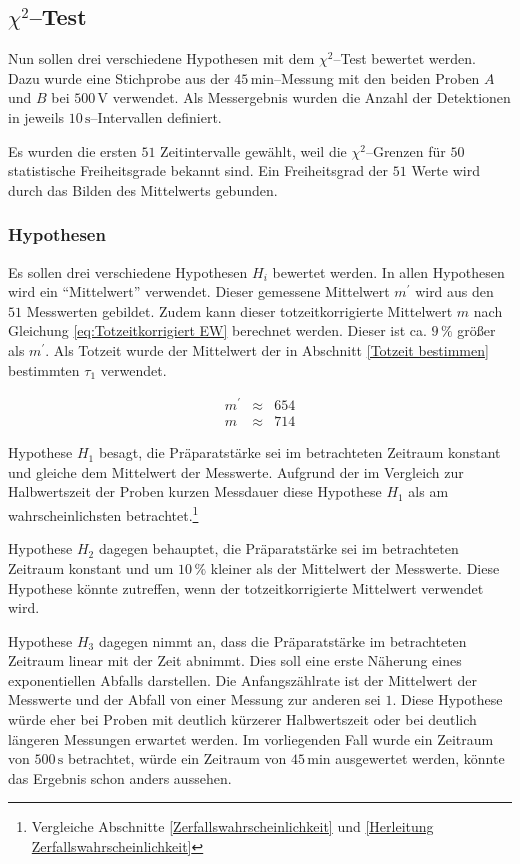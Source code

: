 \documentclass[12pt,a4paper]{scrartcl}
\numberwithin{equation}{section} %
\begin{document}
\hypertarget{chi2test}{\subsection{$\chi^2$--Test}\label{chi2test}}

Nun sollen drei verschiedene Hypothesen mit dem $\chi^2$--Test bewertet werden. Dazu wurde eine Stichprobe aus der $45\mathrm{\,min}$--Messung mit den beiden Proben $A$ und $B$ bei $500\mathrm{\,V}$ verwendet. Als Messergebnis wurden die Anzahl der Detektionen in jeweils $10\mathrm{\,s}$--Intervallen definiert.

Es wurden die ersten $51$ Zeitintervalle gewählt, weil die $\chi^2$--Grenzen für $50$ statistische Freiheitsgrade bekannt sind. \cite{Kapur} Ein Freiheitsgrad der $51$ Werte wird durch das Bilden des Mittelwerts gebunden.

\subsubsection{Hypothesen}
\label{Hypothesen}
Es sollen drei verschiedene Hypothesen $H_i$ bewertet werden. In allen Hypothesen wird ein ``Mittelwert'' verwendet. Dieser gemessene Mittelwert $m^\prime$ wird aus den $51$ Messwerten gebildet. Zudem kann dieser totzeitkorrigierte Mittelwert $m$ nach Gleichung \eqref{eq:Totzeitkorrigiert EW} berechnet werden. Dieser ist ca. $9\,\%$ größer als $m^\prime$. Als Totzeit wurde der Mittelwert der in Abschnitt \ref{Totzeit bestimmen} bestimmten $\tau_1$ verwendet.

\begin{eqnarray}
	m^\prime &\approx& 654 \\
	m &\approx& 714
\end{eqnarray}

Hypothese $H_1$ besagt, die Präparatstärke sei im betrachteten Zeitraum konstant und gleiche dem Mittelwert der Messwerte. Aufgrund der im Vergleich zur Halbwertszeit der Proben kurzen Messdauer diese Hypothese $H_1$ als am wahrscheinlichsten betrachtet.\footnote{Vergleiche Abschnitte \ref{Zerfallswahrscheinlichkeit} und \ref{Herleitung Zerfallswahrscheinlichkeit}}

Hypothese $H_2$ dagegen behauptet, die Präparatstärke sei im betrachteten Zeitraum konstant und um $10\,\%$ kleiner als der Mittelwert der Messwerte. Diese Hypothese könnte zutreffen, wenn der totzeitkorrigierte Mittelwert verwendet wird.

Hypothese $H_3$ dagegen nimmt an, dass die Präparatstärke im betrachteten Zeitraum linear mit der Zeit abnimmt. Dies soll eine erste Näherung eines exponentiellen Abfalls darstellen. Die Anfangszählrate ist der Mittelwert der Messwerte und der Abfall von einer Messung zur anderen sei $1$. Diese Hypothese würde eher bei Proben mit deutlich kürzerer Halbwertszeit oder bei deutlich längeren Messungen erwartet werden. Im vorliegenden Fall wurde ein Zeitraum von $500\mathrm{\,s}$ betrachtet, würde ein Zeitraum von $45\mathrm{\,min}$ ausgewertet werden, könnte das Ergebnis schon anders aussehen.
\end{document}
